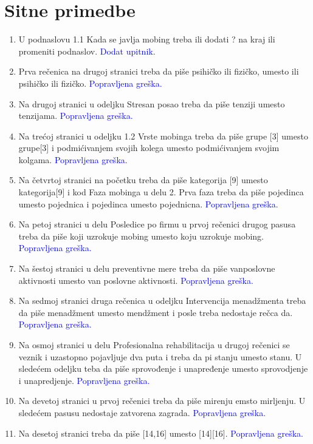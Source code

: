 \documentclass[a4paper]{report}
\newcommand{\odgovor}[1]{\textcolor{blue}{#1}}
\begin{document}
\section{Sitne primedbe}

\begin{enumerate}
    \item U podnaslovu 1.1 Kada se javlja mobing treba ili dodati ? na kraj ili promeniti podnaslov. \odgovor{Dodat upitnik.}
    \item Prva rečenica na drugoj stranici treba da piše psihičko ili fizičko, umesto ili psihičko ili fizičko. \odgovor{Popravljena greška.}
    \item Na drugoj stranici u odeljku Stresan posao treba da piše tenziji umesto tenzijama. \odgovor{Popravljena greška.}
    \item Na trećoj stranici u odeljku 1.2 Vrste mobinga treba da piše grupe [3] umesto grupe[3] i podmićivanjem svojih kolega umesto podmićivanjem svojim kolgama. \odgovor{Popravljena greška.}
    \item Na četvrtoj stranici na početku treba da piše kategorija [9] umesto kategorija[9] i kod Faza mobinga u delu 2. Prva faza treba da piše pojedinca umesto pojednica i pojedinca umesto pojednicna. \odgovor{Popravljena greška.}
    \item Na petoj stranici u delu Posledice po firmu u prvoj rečenici drugog pasusa treba da piše koji uzrokuje mobing umesto koju uzrokuje mobing. \odgovor{Popravljena greška.}
    \item Na šestoj stranici u delu preventivne mere treba da piše vanposlovne aktivnosti umesto van poslovne aktivnosti. \odgovor{Popravljena greška.}
    \item Na sedmoj stranici druga rečenica u odeljku Intervencija menadžmenta treba da piše menadžment umesto mendžment i posle treba nedostaje rečca da. \odgovor{Popravljena greška.}
    \item Na osmoj stranici u delu Profesionalna rehabilitacija u drugoj rečenici se veznik i uzastopno pojavljuje dva puta i treba da pi stanju umesto stanu. U sledećem odeljku teba da piše sprovođenje i unapređenje umesto sprovodjenje i unapredjenje. \odgovor{Popravljena greška.}
    \item Na devetoj stranici u prvoj rečenici treba da piše mirenju emsto mirljenju. U sledećem pasusu nedostaje zatvorena zagrada. \odgovor{Popravljena greška.}
    \item Na desetoj stranici treba da piše  [14,16] umesto [14][16]. \odgovor{Popravljena greška.}
\end{enumerate}
\end{document}
